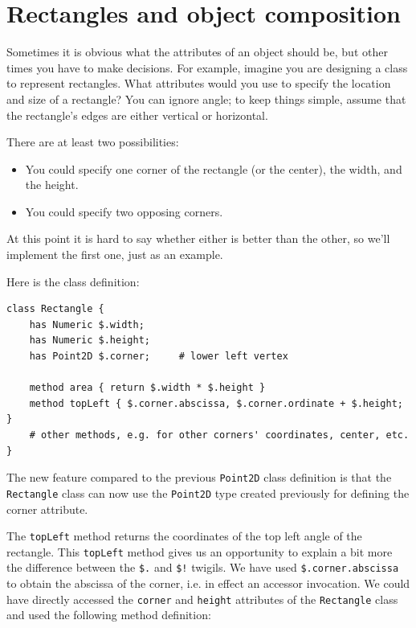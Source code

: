 \section{Rectangles and object composition}
\label{rectangles}

Sometimes it is obvious what the attributes of an object should be,
but other times you have to make decisions.  For example, imagine you
are designing a class to represent rectangles.  What attributes would
you use to specify the location and size of a rectangle?  You can
ignore angle; to keep things simple, assume that the rectangle's edges 
are either vertical or horizontal.

There are at least two possibilities: 

\begin{itemize}

\item You could specify one corner of the rectangle
(or the center), the width, and the height.

\item You could specify two opposing corners.

\end{itemize}

At this point it is hard to say whether either is better than
the other, so we'll implement the first one, just as an example.

Here is the class definition:

\begin{verbatim}
class Rectangle {
    has Numeric $.width;
    has Numeric $.height;
    has Point2D $.corner;     # lower left vertex 

    method area { return $.width * $.height }
    method topLeft { $.corner.abscissa, $.corner.ordinate + $.height; }
    # other methods, e.g. for other corners' coordinates, center, etc.
}
\end{verbatim}
%
The new feature compared to the previous {\tt Point2D} class 
definition is that the \verb'Rectangle' class can now use the 
{\tt Point2D} type created previously for defining the corner 
attribute. 

The {\tt topLeft} method returns the coordinates of 
the top left angle of the rectangle. This {\tt topLeft} 
method gives us an opportunity to explain a bit more 
the difference between the \verb'$.' and \verb'$!' twigils. We have 
used \verb'$.corner.abscissa' to obtain the abscissa of 
the corner, i.e. in effect an accessor invocation. We could 
have directly accessed the {\tt corner} and {\tt height} 
attributes of the {\tt Rectangle} class and used the following 
method definition:

